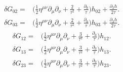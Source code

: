 \documentclass[10pt,letterpaper]{article}
\begin{document}
\begin{align}
\delta G_{02}={}& \bigg(\tfrac{1}{2} \eta^{\mu \nu} \partial_{\mu} \partial_{\nu}
 + \frac{2}{\tau^2}
 + \frac{\partial_{0}}{\tau}\bigg)h_{02}
 + \frac{\partial_{2} h}{2 \tau}.
\end{align}
\begin{align}
\delta G_{03}={}& \bigg(\tfrac{1}{2} \eta^{\mu \nu} \partial_{\mu} \partial_{\nu}
 + \frac{2}{\tau^2}
 + \frac{\partial_{0}}{\tau}\bigg)h_{03}
 + \frac{\partial_{3} h}{2 \tau}.
\end{align}
\begin{align}
\delta G_{12}={}& \bigg(\tfrac{1}{2} \eta^{\mu \nu} \partial_{\mu} \partial_{\nu}
 + \frac{3}{\tau^2}
 + \frac{\partial_{0}}{\tau}\bigg)h_{12}.
\end{align}
\begin{align}
\delta G_{13}={}& \bigg(\tfrac{1}{2} \eta^{\mu \nu} \partial_{\mu} \partial_{\nu}
 + \frac{3}{\tau^2}
 + \frac{\partial_{0}}{\tau}\bigg)h_{13}.
\end{align}
\begin{align}
\delta G_{23}={}& \bigg(\tfrac{1}{2} \eta^{\mu \nu} \partial_{\mu} \partial_{\nu}
 + \frac{3}{\tau^2}
 + \frac{\partial_{0}}{\tau}\bigg)h_{23}.
\end{align}
\end{document}
